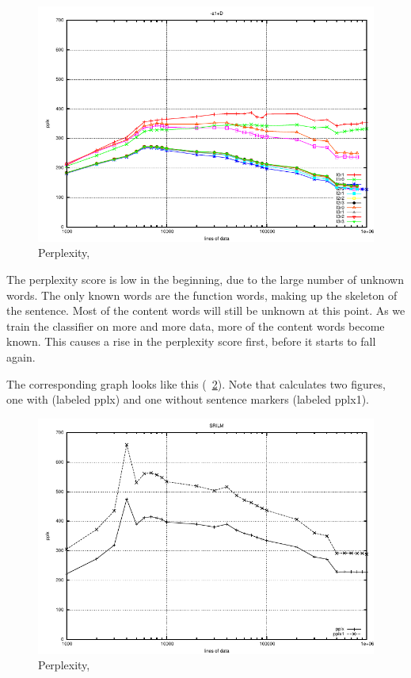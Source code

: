 \documentclass[a4paper,10pt,twoside]{report}
\begin{document}
\begin{figure}[!ht]
  \centering
  \includegraphics[width=\pdfwidth]{NY_pplx_-a1+D.pdf}
  \caption{Perplexity, \igtree{}}
  \label{fig:NY_pplx_-a1+D.pdf}
\end{figure}

The perplexity score is low in the
beginning, due to the large number of unknown words. The only known
words are the function words, making up the skeleton of the
sentence. Most of the content words will still be unknown at this
point. As we train the classifier on more and more data, more of the
content words become known. This causes a rise in the perplexity score
first, before it starts to fall again.

The corresponding \srilm{} graph looks like this
(\figurename~\ref{fig:NY_pplx_slirm.pdf}). Note that \srilm{}
calculates two figures, one with (labeled pplx) and one without sentence
markers (labeled pplx1). 

\begin{figure}[!ht]
  \centering         %
  \includegraphics[width=\pdfwidth]{NY_pplx_slirm.pdf}
  \caption{Perplexity, \srilm{}}
  \label{fig:NY_pplx_slirm.pdf}
\end{figure}
\end{document}

